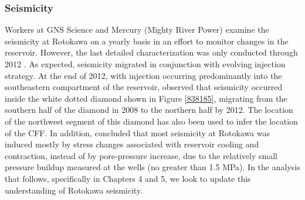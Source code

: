 \subsubsection{Seismicity}
Workers at GNS Science and Mercury (Mighty River Power) examine the seismicity at Rotokawa on a yearly basis in an effort to monitor changes in the reservoir. However, the last detailed characterization was only conducted through 2012 \citep{Sewell_2015WGC,Sherburn_2015}. As expected, seismicity migrated in conjunction with evolving injection strategy. At the end of 2012, with injection occurring predominantly into the southeastern compartment of the reservoir, \citet{Sewell_2015WGC,Sherburn_2015} observed that seismicity occurred inside the white dotted diamond shown in Figure \ref{838185}, migrating from the southern half of the diamond in 2008 to the northern half by 2012. The location of the northwest segment of this diamond has also been used to infer the location of the \acrshort{CFF}. In addition, \citet{Sewell_2015WGC,Sherburn_2015} concluded that most seismicity at Rotokawa was induced mostly by stress changes associated with reservoir cooling and contraction, instead of by pore-pressure increase, due to the relatively small pressure buildup measured at the wells (no greater than 1.5 \acrshort{MPa}). In the analysis that follows, specifically in Chapters 4 and 5, we look to update this understanding of Rotokawa seismicity.

